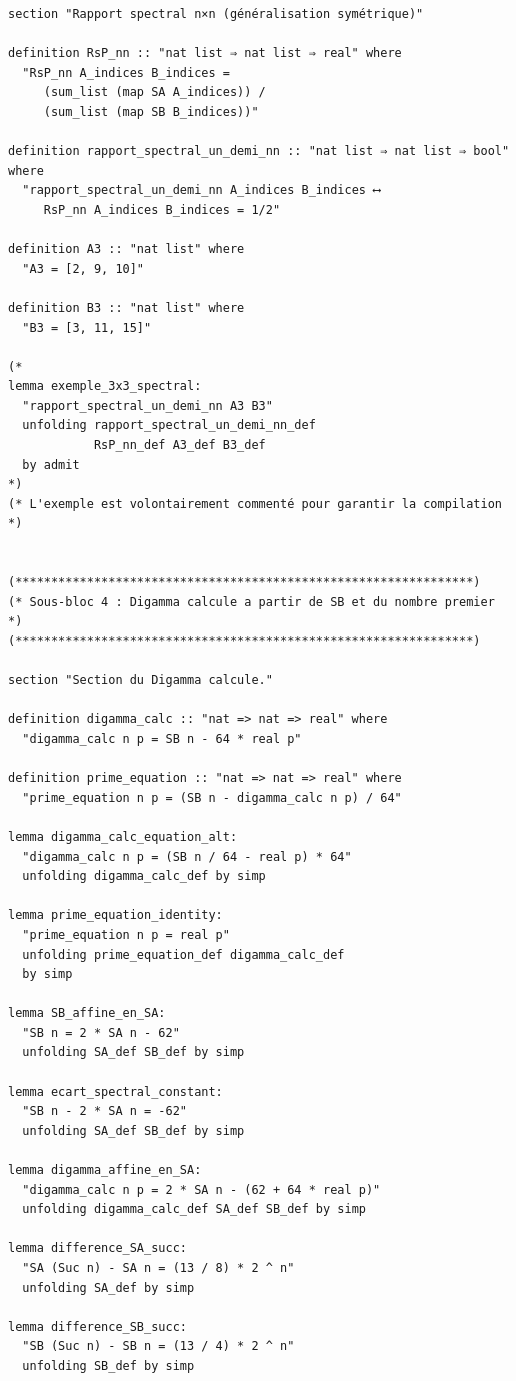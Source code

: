 \documentclass[a4paper,11pt]{article}
\begin{document}
\begin{holcode}[title={\textcolor{white}{Fichier : methode\_spectral.thy -- Partie 1/4}}]
\begin{lstlisting}
section "Rapport spectral n×n (généralisation symétrique)"

definition RsP_nn :: "nat list ⇒ nat list ⇒ real" where
  "RsP_nn A_indices B_indices =
     (sum_list (map SA A_indices)) /
     (sum_list (map SB B_indices))"

definition rapport_spectral_un_demi_nn :: "nat list ⇒ nat list ⇒ bool" where
  "rapport_spectral_un_demi_nn A_indices B_indices ⟷
     RsP_nn A_indices B_indices = 1/2"

definition A3 :: "nat list" where
  "A3 = [2, 9, 10]"

definition B3 :: "nat list" where
  "B3 = [3, 11, 15]"

(*
lemma exemple_3x3_spectral:
  "rapport_spectral_un_demi_nn A3 B3"
  unfolding rapport_spectral_un_demi_nn_def
            RsP_nn_def A3_def B3_def
  by admit
*)
(* L'exemple est volontairement commenté pour garantir la compilation *)


(****************************************************************)
(* Sous-bloc 4 : Digamma calcule a partir de SB et du nombre premier *)
(****************************************************************)

section "Section du Digamma calcule."

definition digamma_calc :: "nat => nat => real" where
  "digamma_calc n p = SB n - 64 * real p"

definition prime_equation :: "nat => nat => real" where
  "prime_equation n p = (SB n - digamma_calc n p) / 64"

lemma digamma_calc_equation_alt:
  "digamma_calc n p = (SB n / 64 - real p) * 64"
  unfolding digamma_calc_def by simp

lemma prime_equation_identity:
  "prime_equation n p = real p"
  unfolding prime_equation_def digamma_calc_def
  by simp

lemma SB_affine_en_SA:
  "SB n = 2 * SA n - 62"
  unfolding SA_def SB_def by simp

lemma ecart_spectral_constant:
  "SB n - 2 * SA n = -62"
  unfolding SA_def SB_def by simp

lemma digamma_affine_en_SA:
  "digamma_calc n p = 2 * SA n - (62 + 64 * real p)"
  unfolding digamma_calc_def SA_def SB_def by simp

lemma difference_SA_succ:
  "SA (Suc n) - SA n = (13 / 8) * 2 ^ n"
  unfolding SA_def by simp

lemma difference_SB_succ:
  "SB (Suc n) - SB n = (13 / 4) * 2 ^ n"
  unfolding SB_def by simp


\end{lstlisting}
\end{holcode}
\end{document}
